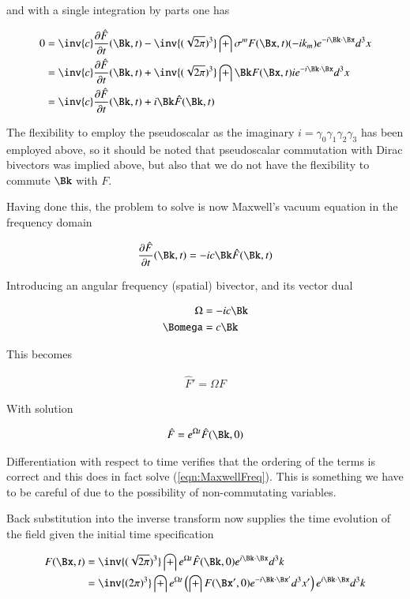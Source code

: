 and with a single integration by parts one has

\begin{align*}
0
&= \inv{c} \PD{t}{\hat{F}}(\Bk,t) - \inv{(\sqrt{2\pi})^3} \int \sigma^m F(\Bx,t) (-i k_m) e^{-i \Bk \cdot \Bx} d^3 x \\
&= \inv{c} \PD{t}{\hat{F}}(\Bk,t) + \inv{(\sqrt{2\pi})^3} \int \Bk F(\Bx,t) i e^{-i \Bk \cdot \Bx} d^3 x \\
&= \inv{c} \PD{t}{\hat{F}}(\Bk,t) + i \Bk \hat{F}(\Bk,t)
\end{align*}

The flexibility to employ the pseudoscalar as the imaginary $i = \gamma_0 \gamma_1 \gamma_2 \gamma_3$ has been employed above, so it should be noted that pseudoscalar commutation with Dirac bivectors was implied above, but also that we do not have the flexibility to commute $\Bk$ with $F$.

Having done this, the problem to solve is now Maxwell's vacuum equation in the frequency domain

\begin{align*}
\PD{t}{\hat{F}}(\Bk,t) = -i c \Bk \hat{F}(\Bk,t)
\end{align*}

Introducing an angular frequency (spatial) bivector, and its vector dual

\begin{align}
\Omega &= -i c \Bk \\
\Bomega &= c \Bk
\end{align}

This becomes

\begin{align}\label{eqn:MaxwellFreq}
\hat{F}' = \Omega F
\end{align}

With solution

\begin{align}
\hat{F} = e^{\Omega t} \hat{F}(\Bk,0)
\end{align}

Differentiation with respect to time verifies that the ordering of the terms is correct and this does in fact solve (\ref{eqn:MaxwellFreq}).  This is something we have to be careful of due to the possibility of non-commutating variables.

Back substitution into the inverse transform now supplies the time evolution of the field given the initial time specification

\begin{align*}
F(\Bx,t)
&= \inv{(\sqrt{2\pi})^3} \int e^{\Omega t} \hat{F}(\Bk,0) e^{i \Bk \cdot \Bx} d^3 k \\
&= \inv{(2\pi)^3} \int e^{\Omega t} \left( \int {F}(\Bx',0) e^{-i \Bk \cdot \Bx'} d^3 x' \right) e^{i \Bk \cdot \Bx} d^3 k
\end{align*}

